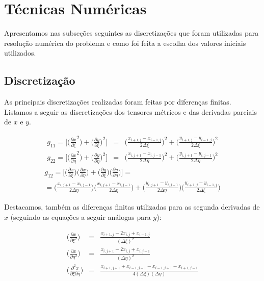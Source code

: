 \documentclass{article}
\newcommand{\diff}[2]{
	\frac{\partial #1}{\partial #2}
}
\newcommand{\diffxixi}[1]{
	\diff{#1}{\xi^2}
}
\newcommand{\diffetaeta}[1]{
	\diff{#1}{\eta^2}
}
\newcommand{\diffxieta}[1]{
	\diff{^2#1}{\xi\partial\eta}
}
\newcommand{\diffxi}[1]{
	\diff{#1}{\xi}
}
\newcommand{\diffeta}[1]{
	\diff{#1}{\eta}
}
\begin{document}
	\section{Técnicas Numéricas} %
	\label{sec:t_cnicas_num_ricas}

		Apresentamos nas subseções seguintes as discretizações que foram utilizadas para resolução numérica do problema e como foi feita a escolha dos valores iniciais utilizados.

		\subsection{Discretização} %
		\label{sub:discretiza_o}
			As principais discretizações realizadas foram feitas por diferenças finitas. Listamos a seguir as discretizações dos tensores métricos e das derivadas parciais de $x$ e $y$.

			\begin{eqnarray*}
				g_{11} = \Bigg[ \Big( \diffxi{x}^2 \Big) + \Big(\diffxi{y}\Big)^2 \Bigg] &=& \Big( \frac{x_{i+1,j} - x_{i-1,j}}{2\Delta\xi} \Big)^2 + \Big( \frac{y_{i+1,j} - y_{i-1,j}}{2\Delta\xi} \Big)^2\\
				g_{22} = \Bigg[ \Big( \diffeta{x}^2 \Big) + \Big(\diffeta{y}\Big)^2 \Bigg] &=& \Big( \frac{x_{i,j+1} - x_{i,j-1}}{2\Delta\eta} \Big)^2 + \Big( \frac{y_{i,j+1} - y_{i,j-1}}{2\Delta\eta} \Big)^2
			\end{eqnarray*}
			\begin{multline*}
				g_{12} = \Bigg[ \Big( \diffxi{x}\Big)\Big(\diffeta{x} \Big) + \Big(\diffxi{y}\Big)\Big(\diffeta{y}\Big) \Bigg] = \\
					= \Big( \frac{x_{i,j+1} - x_{i,j-1}}{2\Delta\eta} \Big) \Big( \frac{x_{i,j+1} - x_{i,j-1}}{2\Delta\eta} \Big) + \Big( \frac{y_{i,j+1} - y_{i,j-1}}{2\Delta\eta} \Big)\Big( \frac{y_{i+1,j} - y_{i-1,j}}{2\Delta\xi} \Big)
			\end{multline*}

			Destacamos, também as diferenças finitas utilizadas para as segunda derivadas de $x$ (seguindo as equações a seguir análogas para $y$):

			\begin{eqnarray*}
				\Big( \diffxixi{x} \Big) &=& \frac{x_{i+1,j} - 2x_{i,j} + x_{i-1,j}}{(\Delta\xi)^2}\\
				\Big( \diffetaeta{x} \Big) &=& \frac{x_{i,j+1} - 2x_{i,j} + x_{i,j-1}}{(\Delta\eta)^2}\\
				\Big( \diffxieta{x} \Big) &=& \frac{x_{i+1,j+1} +x_{i-1,j-1} - x_{i-1,j+1} - x_{i+1,j-1}}{4(\Delta\xi)(\Delta\eta)}
			\end{eqnarray*}
\end{document}
